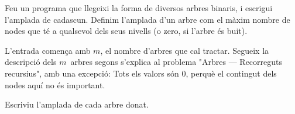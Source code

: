 


\Statement

Feu un programa que llegeixi la forma de diversos arbres binaris,
i escrigui l'amplada de cadascun.
Definim l'amplada d'un arbre
com el màxim nombre de nodes que té a qualsevol dels seus nivells
(o zero, si l'arbre és buit).



\Input

L'entrada comença amb $m$, el nombre d'arbres que cal tractar. Segueix la
descripció dels $m$~arbres segons s'explica al problema "Arbres ---
Recorreguts recursius", amb una excepció: Tots els valors són 0, perquè el
contingut dels nodes aquí no és important.



\Output

Escriviu l'amplada de cada arbre donat.



\SampleOneCol
